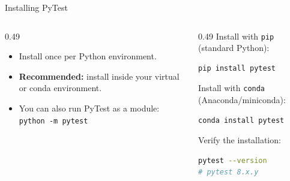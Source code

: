 {}
{}
{}

{}
{}
{}

\begin{frame}{Installing PyTest}
\setlength{\leftmargini}{0.5cm}
\begin{columns}[c,t,totalwidth=1.0\textwidth]
\begin{column}[c]{0.49\linewidth}
\begin{block}{}
\begin{itemize}
\item Install once per Python environment.
\item \textbf{Recommended:} install inside your virtual or conda environment.
\item You can also run PyTest as a module: \texttt{python -m pytest}
\end{itemize}
\end{block}
\end{column}
\begin{column}[c]{0.49\linewidth}
Install with \texttt{pip} (standard Python):
\begin{lstlisting}[style=fullwidth,language=bash,numbers=none]
pip install pytest
\end{lstlisting}
Install with \texttt{conda} (Anaconda/miniconda):
\begin{lstlisting}[style=fullwidth,language=bash,numbers=none]
conda install pytest
\end{lstlisting}
Verify the installation:
\begin{lstlisting}[style=fullwidth,language=bash,numbers=none]
pytest --version
# pytest 8.x.y
\end{lstlisting}
\end{column}
\end{columns}
\end{frame}

